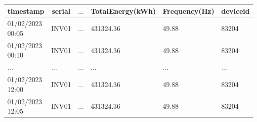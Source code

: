\begin{table}[H]
	\begin{center}
		\begin{tabular}[c]{l|l|l|l|l|l}
			\hline
			\multicolumn{1}{c|}{\textbf{timestamp}}        &
			\multicolumn{1}{c|}{\textbf{serial}}           &
			\multicolumn{1}{c|}{\textbf{$\ldots$}}         &
			\multicolumn{1}{c|}{\textbf{TotalEnergy(kWh)}} &
			\multicolumn{1}{c|}{\textbf{Frequency(Hz)}}    &
			\multicolumn{1}{c}{\textbf{deviceid}}            \\
			\hline
			01/02/2023 00:05                               &
			INV01                                          &
			$\ldots$                                       &
			431324.36                                      &
			49.88                                          &
			83204                                            \\

			01/02/2023 00:10                               &
			INV01                                          &
			$\ldots$                                       &
			431324.36                                      &
			49.88                                          &
			83204                                            \\


			$\ldots$                                       &
			$\ldots$                                       &
			$\ldots$                                       &
			$\ldots$                                       &
			$\ldots$                                       &
			$\ldots$                                         \\
			01/02/2023 12:00                               &
			INV01                                          &
			$\ldots$                                       &
			431324.36                                      &
			49.88                                          &
			83204                                            \\
			01/02/2023 12:05                               &
			INV01                                          &
			$\ldots$                                       &
			431324.36                                      &
			49.88                                          &
			83204                                            \\


\end{tabular}
\end{center}
\end{table}
